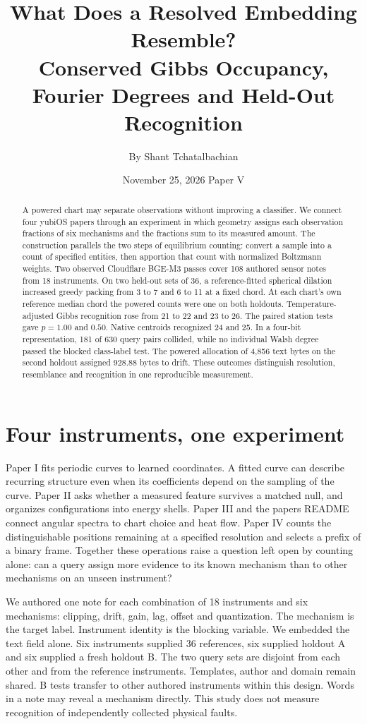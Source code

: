 \documentclass[11pt,a4paper]{article}
\title{What Does a Resolved Embedding Resemble?\\
{\large Conserved Gibbs Occupancy, Fourier Degrees and Held-Out Recognition}}
\author{By Shant Tchatalbachian}
\date{November 25, 2026 \qquad Paper V}
\begin{document}
\maketitle
\begin{abstract}
A powered chart may separate observations without improving a classifier. We connect four yubiOS papers through an experiment in which geometry assigns each observation fractions of six mechanisms and the fractions sum to its measured amount. The construction parallels the two steps of equilibrium counting: convert a sample into a count of specified entities, then apportion that count with normalized Boltzmann weights. Two observed Cloudflare BGE-M3 passes cover 108 authored sensor notes from 18 instruments. On two held-out sets of 36, a reference-fitted spherical dilation increased greedy packing from 3 to 7 and 6 to 11 at a fixed chord. At each chart's own reference median chord the powered counts were one on both holdouts. Temperature-adjusted Gibbs recognition rose from 21 to 22 and 23 to 26. The paired station tests gave $p=1.00$ and $0.50$. Native centroids recognized 24 and 25. In a four-bit representation, 181 of 630 query pairs collided, while no individual Walsh degree passed the blocked class-label test. The powered allocation of 4,856 text bytes on the second holdout assigned 928.88 bytes to drift. These outcomes distinguish resolution, resemblance and recognition in one reproducible measurement.
\end{abstract}

\section{Four instruments, one experiment}
Paper I fits periodic curves to learned coordinates. A fitted curve can describe recurring structure even when its coefficients depend on the sampling of the curve. Paper II asks whether a measured feature survives a matched null, and organizes configurations into energy shells. Paper III and the papers README connect angular spectra to chart choice and heat flow. Paper IV counts the distinguishable positions remaining at a specified resolution and selects a prefix of a binary frame. Together these operations raise a question left open by counting alone: can a query assign more evidence to its known mechanism than to other mechanisms on an unseen instrument? \citep{p1,p2,p3,p4,readme}

We authored one note for each combination of 18 instruments and six mechanisms: clipping, drift, gain, lag, offset and quantization. The mechanism is the target label. Instrument identity is the blocking variable. We embedded the text field alone. Six instruments supplied 36 references, six supplied holdout A and six supplied a fresh holdout B. The two query sets are disjoint from each other and from the reference instruments. Templates, author and domain remain shared. B tests transfer to other authored instruments within this design. Words in a note may reveal a mechanism directly. This study does not measure recognition of independently collected physical faults.
\end{document}
